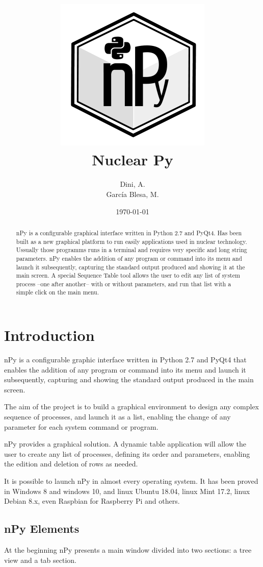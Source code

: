 \documentclass[a4paper,10pt]{article}
\author{Dini, A. \\García Blesa, M.}%
\date{\today}%
\title{\includegraphics[scale=0.5]{img/nPyLogo.png}\\Nuclear Py}%
\begin{document}
\maketitle

\begin{abstract}
nPy is a configurable graphical interface written in Python 2.7 and PyQt4. Has been built as a new graphical platform to run easily applications used in nuclear technology. Ussually those programms runs in a terminal and requires very specific and long string parameters. nPy enables the addition of any program or command into its menu and launch it subsequently, capturing the standard output produced and showing it at the main screen. A special Sequence Table tool allows the user to edit any list of system process --one after another-- with or without parameters, and run that list with a simple click on the main menu.
\end{abstract}
\newpage

\tableofcontents
\newpage

\section{Introduction}
nPy is a configurable graphic interface written in Python 2.7 and PyQt4 that enables the addition of any program or command into its menu and launch it subsequently, capturing and showing the standard output produced in the main screen.

The aim of the project is to build a graphical environment to design any complex sequence of processes, and launch it as a list, enabling the change of any parameter for each system command or program.

nPy provides a graphical solution. A dynamic table application will allow the user to create any list of processes, defining its order and parameters, enabling the edition and deletion of rows as needed.

It is possible to launch nPy in almost every operating system. It has been proved in Windows 8 and windows 10, and linux Ubuntu 18.04, linux Mint 17.2, linux Debian 8.x, even Raspbian for Raspberry Pi and others.

\subsection{nPy Elements}

At the beginning nPy presents a main window divided into two sections: a tree view and a tab section.
\end{document}
